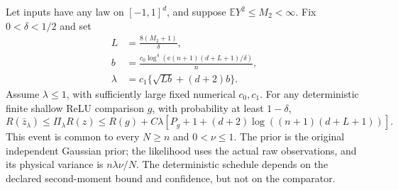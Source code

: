 \begin{theorem}
\label{thm:general-shallow-finitevariance}
Let inputs have any law on $[-1,1]^d$, and suppose
$\mathbb E Y^2\le M_2<\infty$. Fix $0<\delta<1/2$ and set
\begin{align*}
 L&=\frac{8(M_2+1)}\delta,\\
 b&=\frac{c_0\log^4(\mathrm e(n+1)(d+L+1)/\delta)}n,\\
 \lambda&=c_1\{\sqrt{Lb}+(d+2)b\}.
\end{align*}
Assume $\lambda\le1$, with sufficiently large fixed numerical
$c_0,c_1$. For any deterministic finite shallow ReLU comparison $g$,
with probability at least $1-\delta$,
\[
 R(\bar z_\lambda)\le\Pi_\lambda R(z)
 \le R(g)+C\lambda
       [P_g+1+(d+2)\log((n+1)(d+L+1))].                 \tag{GF2}
\]
This event is common to every $N\ge n$ and $0<\nu\le1$.
The prior is the original independent Gaussian prior; the likelihood
uses the actual raw observations, and its physical variance is
$n\lambda\nu/N$. The deterministic schedule depends on the declared
second-moment bound and confidence, but not on the comparator.
\end{theorem}
